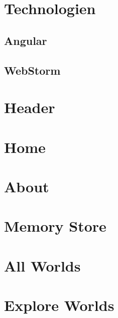 
\section{Technologien}

\subsection{Angular}

\subsection{WebStorm}

\section{Header}




\section{Home}

\section{About}

\section{Memory Store}

\section{All Worlds}

\section{Explore Worlds}